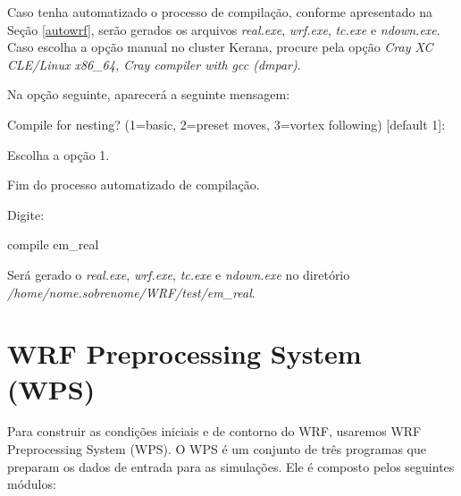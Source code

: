 \noindent Caso tenha automatizado o processo de compilação, conforme apresentado na Seção \textcolor{bleu_cite}{\ref{autowrf}}, serão gerados os arquivos \textit{real.exe}, \textit{wrf.exe}, \textit{tc.exe} e \textit{ndown.exe}. Caso escolha a opção manual no cluster Kerana, procure pela opção \textit{Cray XC CLE/Linux x86\_64, Cray compiler with gcc  (dmpar)}.
\bigskip

\noindent Na opção seguinte, aparecerá a seguinte mensagem:
\bigskip

\begin{bashcode}
Compile for nesting? (1=basic, 2=preset moves, 3=vortex following) [default 1]:
\end{bashcode}
\bigskip

\noindent Escolha a opção 1.
\bigskip

\begin{tcolorbox}[enhanced,
  grow to left by=0cm,%
  grow to right by=0cm,%
  enlarge top by=0cm,%
  enlarge bottom by=0cm,%
  tcbox raise base,
  boxrule=1.0pt,
  left=18mm,
  colframe=red!50!black,coltext=red!25!black,colback=red!10!white,
  overlay={\begin{tcbclipinterior}\fill[red!75!blue!50!white] (frame.south west)
    rectangle node[text=white,font=\sffamily\bfseries\footnotesize,rotate=0] {ATENÇÃO} ([xshift=18mm]frame.north west);\end{tcbclipinterior}}]
Fim do processo automatizado de compilação.
\end{tcolorbox}
\bigskip

\noindent Digite:
\bigskip

\begin{bashcode}
compile em_real
\end{bashcode}
\bigskip

\noindent Será gerado o \textit{real.exe}, \textit{wrf.exe}, \textit{tc.exe} e \textit{ndown.exe} no diretório \textit{/home/nome.sobrenome/WRF/test/em\_real}.
\bigskip

\section{WRF Preprocessing System (WPS)}
\bigskip

\noindent Para construir as condições iniciais e de contorno do WRF, usaremos WRF Preprocessing System (WPS). O WPS é um conjunto de três programas que preparam os dados de entrada para as simulações. Ele é composto pelos seguintes módulos:
\bigskip

